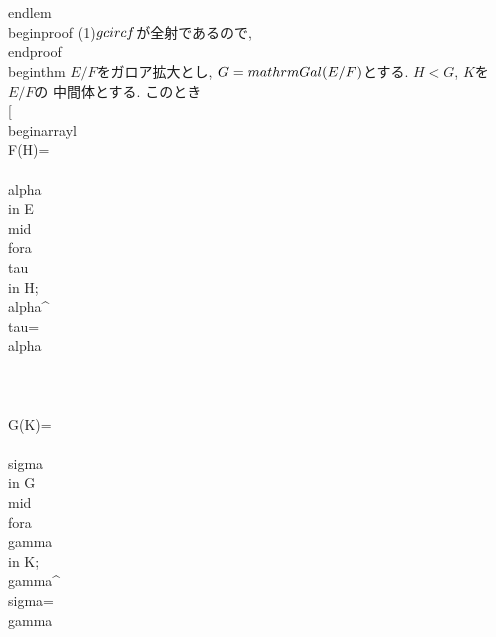 {  \\[
   \\begin{array}{l}
    g\\circ f\\text{が全射}\\Rightarrow g\\text{は全射}\\cdots\\cdots (1)\\\\
    g\\circ f\\text{が単射}\\Rightarrow g\\text{は単射}\\cdots\\cdots (2)\\\\
   \\end{array}
  \\]
 \\end{lem}
 \\begin{proof}
  (1)$g\\circ f$が全射であるので, 
 \\end{proof}
\\begin{thm}
 $E/F$をガロア拡大とし, $G=\\mathrm{Gal}(E/F)$とする. $H<G$, $K$を$E/F$の
 中間体とする. このとき
 \\[
  \\begin{array}{l}
   \\F(H)=\\{\\alpha\\in E\\mid \\fora \\tau\\in H;\\alpha^{\\tau}=\\alpha\\}\\\\
   \\G(K)=\\{\\sigma\\in G\\mid \\fora \\gamma\\in K;\\gamma^{\\sigma}=\\gamma\\}\\\\
}
